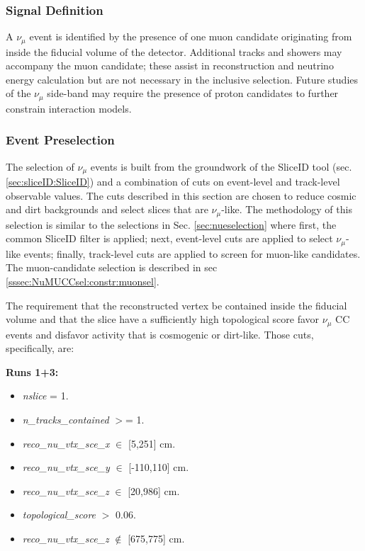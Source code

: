 \subsubsection{Signal Definition}
\label{sssec:NuMUCCsel:constr:signaldef}
\par A $\nu_{\mu}$ event is identified by the presence of one muon candidate originating from inside the fiducial volume of the detector. Additional tracks and showers may accompany the muon candidate; these assist in reconstruction and neutrino energy calculation but are not necessary in the inclusive selection. Future studies of the $\nu_{\mu}$ side-band may require the presence of proton candidates to further constrain interaction models.

\subsubsection{Event Preselection}
\label{sssec:NuMUCCsel:constr:preselec}

\par The selection of $\nu_{\mu}$ events is built from the groundwork of the SliceID tool (sec. \ref{sec:sliceID:SliceID}) and a combination of cuts on event-level and track-level observable values. The cuts described in this section are chosen to reduce cosmic and dirt backgrounds and select slices that are $\nu_{\mu}$-like. The methodology of this selection is similar to the selections in Sec. \ref{sec:nueselection} where first, the common SliceID filter is applied; next, event-level cuts are applied to select $\nu_{\mu}$-like events; finally, track-level cuts are applied to screen for muon-like candidates. The muon-candidate selection is described in sec \ref{sssec:NuMUCCsel:constr:muonsel}.

\par The requirement that the reconstructed vertex be contained inside the fiducial volume and that the slice have a sufficiently high topological score favor $\nu_{\mu}$ CC events and disfavor activity that is cosmogenic or dirt-like. Those cuts, specifically, are:

\textbf{Runs 1+3:}
\begin{itemize}
    \item \emph{nslice} = 1.
    \item \emph{n\_tracks\_contained} $>$= 1.
    \item \emph{reco\_nu\_vtx\_sce\_x} $\in$ [5,251] cm.
    \item \emph{reco\_nu\_vtx\_sce\_y} $\in$ [-110,110] cm.
    \item \emph{reco\_nu\_vtx\_sce\_z} $\in$ [20,986] cm.
    \item \emph{topological\_score} $>$ 0.06.
    \item \emph{reco\_nu\_vtx\_sce\_z} $\not\in$ [675,775] cm.
\end{itemize}

